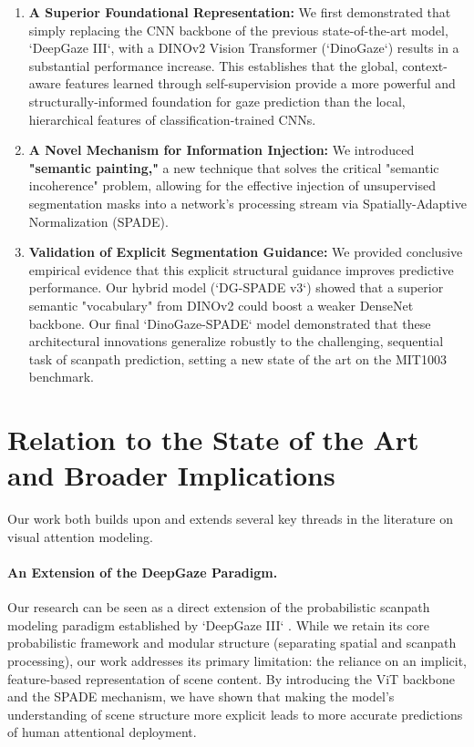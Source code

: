 \begin{enumerate}
    \item \textbf{A Superior Foundational Representation:} We first demonstrated that simply replacing the CNN backbone of the previous state-of-the-art model, `DeepGaze III`, with a DINOv2 Vision Transformer (`DinoGaze`) results in a substantial performance increase. This establishes that the global, context-aware features learned through self-supervision provide a more powerful and structurally-informed foundation for gaze prediction than the local, hierarchical features of classification-trained CNNs.

    \item \textbf{A Novel Mechanism for Information Injection:} We introduced \textbf{"semantic painting,"} a new technique that solves the critical "semantic incoherence" problem, allowing for the effective injection of unsupervised segmentation masks into a network's processing stream via Spatially-Adaptive Normalization (SPADE).

    \item \textbf{Validation of Explicit Segmentation Guidance:} We provided conclusive empirical evidence that this explicit structural guidance improves predictive performance. Our hybrid model (`DG-SPADE v3`) showed that a superior semantic "vocabulary" from DINOv2 could boost a weaker DenseNet backbone. Our final `DinoGaze-SPADE` model demonstrated that these architectural innovations generalize robustly to the challenging, sequential task of scanpath prediction, setting a new state of the art on the MIT1003 benchmark.
\end{enumerate}

\section{Relation to the State of the Art and Broader Implications}
\label{sec:discussion_literature}

Our work both builds upon and extends several key threads in the literature on visual attention modeling.

\paragraph{An Extension of the DeepGaze Paradigm.} Our research can be seen as a direct extension of the probabilistic scanpath modeling paradigm established by `DeepGaze III` \cite{kummerer2022deepgaze}. While we retain its core probabilistic framework and modular structure (separating spatial and scanpath processing), our work addresses its primary limitation: the reliance on an implicit, feature-based representation of scene content. By introducing the ViT backbone and the SPADE mechanism, we have shown that making the model's understanding of scene structure more explicit leads to more accurate predictions of human attentional deployment.

